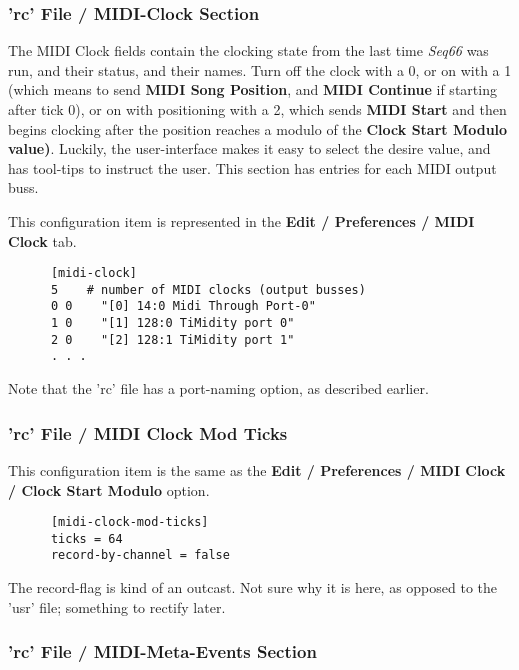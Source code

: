 \subsubsection{'rc' File / MIDI-Clock Section}
\label{subsec:configuration_rc_midi_clock}

   The MIDI Clock fields contain the clocking state from the last 
   time \textsl{Seq66} was run, and their status, and their names.
   Turn off the clock with a 0, or on
   with a 1 (which means to send
   \textbf{MIDI Song Position}, and
   \textbf{MIDI Continue} if
   starting after tick 0), or on with positioning with a 2, which sends
   \textbf{MIDI Start}
   and then begins clocking after the position reaches a modulo of the
   \textbf{Clock Start Modulo value)}.  Luckily, the user-interface makes it
   easy to select the desire value, and has tool-tips to instruct the user.
   This section has entries for each MIDI output buss.

   This configuration item is represented in the
   \textbf{Edit / Preferences / MIDI Clock} tab.

   \begin{verbatim}
      [midi-clock]
      5    # number of MIDI clocks (output busses)
      0 0    "[0] 14:0 Midi Through Port-0"
      1 0    "[1] 128:0 TiMidity port 0"
      2 0    "[2] 128:1 TiMidity port 1"
      . . .
   \end{verbatim}

   Note that the 'rc' file has a port-naming option, as described earlier.

\subsubsection{'rc' File / MIDI Clock Mod Ticks}
\label{subsubsec:configuration_rc_midi_cmt}

   This configuration item is the same as the
   \textbf{Edit / Preferences / MIDI Clock / Clock Start Modulo} option.

   \begin{verbatim}
      [midi-clock-mod-ticks]
      ticks = 64
      record-by-channel = false
   \end{verbatim}

   The record-flag is kind of an outcast.  Not sure why it is here, as
   opposed to the 'usr' file;
   something to rectify later.

\subsubsection{'rc' File / MIDI-Meta-Events Section}
\label{subsubsec:configuration_rc_midi_meta_events}

